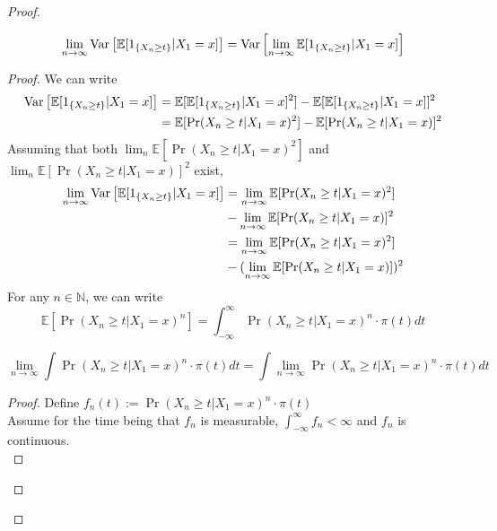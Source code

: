 \begin{theorem}
\begin{proof}
\begin{lem}
        \end{lem}
        \begin{lem}
            $$\lim_{n \rightarrow \infty} \text{Var}\left[{{\mathbb{E}[1_{\{X_{n} \geq t\}}|X_1=x]}}\right] = \text{Var}\left[{{\lim_{n \rightarrow \infty} \mathbb{E}[1_{\{X_{n} \geq t\}}|X_1=x]}}\right]$$
            \begin{proof}
                We can write
                \begin{align*}
                    \text{Var}\left[{{\mathbb{E}[1_{\{X_{n} \geq t\}}|X_1=x]}}\right] &= \mathbb{E}[\mathbb{E}[1_{\{X_{n} \geq t\}}|X_1=x]^2] - \mathbb{E}[\mathbb{E}[1_{\{X_{n} \geq t\}}|X_1=x]]^2 \\
                    &= \mathbb{E}[\Pr(X_{n} \geq t | X_{1} = x)^2] - \mathbb{E}[\Pr(X_{n} \geq t | X_{1} = x)]^2
                \end{align*}
                Assuming that both $\lim_n \mathbb{E}[\Pr(X_{n} \geq t | X_{1} = x)^2]$ and  $\lim_n \mathbb{E}[\Pr(X_{n} \geq t | X_{1} = x)]^2$ exist,
                \begin{align*}
                    \lim_{n \rightarrow \infty} \text{Var}\left[{{\mathbb{E}[1_{\{X_{n} \geq t\}}|X_1=x]}}\right] &= \lim_{n \rightarrow \infty} \mathbb{E}[\Pr(X_{n} \geq t | X_{1} = x)^2]\\
                    &- \lim_{n \rightarrow \infty} \mathbb{E}[\Pr(X_{n} \geq t | X_{1} = x)]^2\\
                    &= \lim_{n \rightarrow \infty} \mathbb{E}[\Pr(X_{n} \geq t | X_{1} = x)^2]\\
                    &- (\lim_{n \rightarrow \infty} \mathbb{E}[\Pr(X_{n} \geq t | X_{1} = x)])^2\\
                \end{align*}
                For any $n \in \mathbb{N}$, we can write
                $$\mathbb{E}[\Pr(X_{n} \geq t | X_{1} = x)^n] = \int_{-\infty}^{\infty} \Pr(X_{n} \geq t | X_{1} = x)^n \cdot \pi(t)dt$$
                \begin{lem}
                    $$\lim_{n \rightarrow \infty} \int \Pr(X_{n} \geq t | X_{1} = x)^n \cdot \pi(t) dt = \int \lim_{n \rightarrow \infty}\Pr(X_{n} \geq t | X_{1} = x)^n \cdot \pi(t)dt$$
                    \begin{proof}
                        Define $f_n(t) := \Pr(X_{n} \geq t | X_{1} = x)^n \cdot \pi(t) $ \\
                        Assume for the time being that $f_n$ is measurable, $\int_{-\infty}^{\infty} f_n < \infty$ and $f_n$ is continuous.\\

\end{proof}
\end{lem}
\end{proof}
\end{lem}
\end{proof}
\end{theorem}
